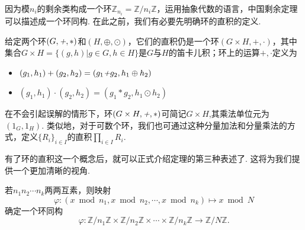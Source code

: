 \documentclass[color=green,mathpazo,titlestyle=hang]{elegantbook}
\begin{document}
  因为模$n_i$的剩余类构成一个环$\mathbb{Z}_{n_i}=\mathbb{Z}/n_i\mathbb{Z}$，运用抽象代数的语言，中国剩余定理可以描述成一个环同构. 在此之前，我们有必要先明确环的直积的定义.



\begin{newdef}[环的直积]
	给定两个环$(G,\emph{+},\ast)$和$(H,\oplus,\odot)$，它们的直积仍是一个环$(G\times H,+,\cdot)$，其中集合$G\times H=\{(g,h)|g\in G, h\in H\}$是$G$与$H$的笛卡儿积；环上的运算$+,\cdot$定义为
	\begin{itemize}
		\parskip=0pt \itemsep=0pt
		\item $(g_1,h_1)+(g_2,h_2)=(g_1\emph{+}g_2,h_1\oplus h_2)$
		\item $(g_1,h_1)\cdot(g_2,h_2)=(g_1\ast g_2,h_1\odot h_2)$
	\end{itemize}
	在不会引起误解的情形下，环$(G\times H,\emph{+},\ast)$可简记$G\times H$,其乘法单位元为$(1_G,1_H)$. 类似地，对于可数个环，我们也可通过这种分量加法和分量乘法的方式，定义$\{R_i\}_{i\in I}$的直积$\prod\limits_{i\in I}R_i$.
\end{newdef}


  有了环的直积这一个概念后，就可以正式介绍定理的第三种表述了. 这将为我们提供一个更加清晰的视角.

  
  \begin{newthem}[中国剩余定理III]
  	若$n_1n_2\cdots n_k$两两互素，则映射
  	\[
  	\varphi:(x\bmod n_1,x\bmod n_2,\cdots,x\bmod n_k)\mapsto x\bmod N
  	\]
  	确定一个环同构
  	\[
  	\varphi:\mathbb{Z}/n_1\mathbb{Z}\times\mathbb{Z}/n_2\mathbb{Z}\times\cdots\times\mathbb{Z}/n_k\mathbb{Z}\rightarrow\mathbb{Z}/N\mathbb{Z}.
  	\]
  

  \end{newthem}
\end{document}
